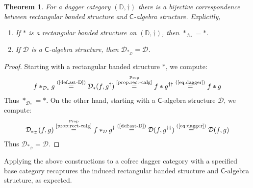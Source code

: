 \documentclass[10pt]{article}
\newtheorem{theorem}[observation]{Theorem}
\begin{document}
\begin{theorem}\label{thm:coag=rect} For a dagger category $(\mathbb{D}, \dagger)$ there is a bijective correspondence between rectangular banded structure and $\mathsf{C}$-algebra structure. Explicitly,
\begin{enumerate}[{\em (i)}]
\item If $\ast$ is a rectangular banded structure on $(\mathbb{D}, \dagger)$, then $\ast_{\mathcal{D}_\ast} = \ast$.
\item If $\mathcal{D}$ is a $\mathsf{C}$-algebra structure, then $\mathcal{D}_{\ast_\mathcal{D}} = \mathcal{D}$. 
\end{enumerate}
\end{theorem}
\begin{proof} Starting with a rectangular banded structure $\ast$, we compute: 
\begin{gather*}
f \ast_{\mathcal{D}_\ast} g \overset{\text{(\ref{def:ast-D})}}{=} \mathcal{D}_\ast(f,g^\dagger) \overset{\overset{\text{Prop}}{\text{\ref{prop:rect-calg}}}}{=} f \ast g^{\dagger\dagger} \overset{\text{(\ref{eq:dagger})}}{=} f \ast g
\end{gather*}
Thus $\ast_{\mathcal{D}_\ast} = \ast$. On the other hand, starting with a $\mathsf{C}$-algebra structure $\mathcal{D}$, we compute: 
\begin{gather*}
\mathcal{D}_{\ast_\mathcal{D}}(f,g) \overset{\overset{\text{Prop}}{\text{\ref{prop:rect-calg}}}}{=} f \ast_\mathcal{D} g^\dagger \overset{\text{(\ref{def:ast-D})}}{=} \mathcal{D}(f,g^{\dagger\dagger}) \overset{\text{(\ref{eq:dagger})}}{=} \mathcal{D}(f,g)
\end{gather*}
Thus $\mathcal{D}_{\ast_\mathcal{D}} = \mathcal{D}$. 
\end{proof}

Applying the above constructions to a cofree dagger category with a specified base category recaptures the induced rectangular banded structure and $\mathsf{C}$-algebra structure, as expected. 
\end{document}
